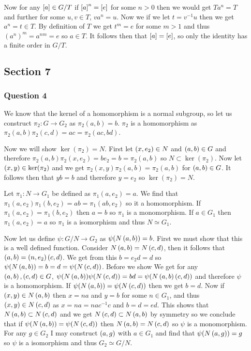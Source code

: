 \documentclass{article}
\begin{document}
Now for any $\left[{a}\right]\in G/T$ if $\left[{a}\right]^n = \left[{e}\right]$ for some $n > 0$ then we would get $Ta^n = T$ and further for some $u,v\in T$, $va^n = u$. Now we if we let $t =v^{-1}u$ then we get $a^n = t \in T$. By definition of $T$ we get $t^m = e$ for some $m > 1$ and thus $\left(a^n\right)^m = a^{nm} = e$ so $a \in T$. It follows then that $\left[{a}\right] = \left[{e}\right]$, so only the identity has a finite order in $G/T$.


\subsection{Section 7}
\subsubsection{Question 4}
We know that the kernel of a homomorphism is a normal subgroup, so let us construct $\pi_2:G\to G_2$ as $\pi_2(a,b) = b$. $\pi_2$ is a homomorphism as $\pi_2(a,b)\pi_2(c,d) = ac = \pi_2(ac,bd)$.

Now we will show $\ker(\pi_2) = N$. First let $\left( {x} , {e_2} \right) \in N$ and $\left( {a} , {b} \right) \in G$ and therefore $\pi_2(a,b)\pi_2(x,e_2) = be_2 = b = \pi_2(a,b)$ so $N \subset \ker(\pi_2)$. Now let $\left( {x} , {y} \right)\in\ker(\pi_2)$ and we get $\pi_2(x,y)\pi_2(a,b) = \pi_2(a,b)$ for $\left( {a} , {b} \right) \in G$. It follows then that $yb = b$ and therefore $y=e_2$ so $\ker(\pi_2) = N$.

Let $\pi_1:N\to G_1$ be defined as $\pi_1(a,{e_2}) = a$. We find that $\pi_1(a,e_2)\pi_1(b,e_2) = ab = \pi_1(ab,e_2)$ so it a homomorphism. If $\pi_1(a,e_2) = \pi_1(b,e_2)$ then $a =b$ so $\pi_1$ is a monomorphism. If $a \in G_1$ then $\pi_1(a, e_2) = a$ so $\pi_1$ is a isomorphism and thus $N \simeq G_1$.

Now let us define $\psi:G/N \to G_2$ as $\psi(N\left( {a} , {b} \right)) = b$. First we must show that this is a well defined function. Consider $N\left( {a} , {b} \right) = N\left( {c} , {d} \right)$, then it follows that $\left( {a} , {b} \right) = \left( {n} , {e_2} \right)\left( {c} , {d} \right)$. We get from this $b = e_2d = d$ so $\psi(N\left( {a} , {b} \right)) = b = d = \psi(N\left( {c} , {d} \right))$. Before we show  We get for any $\left( {a} , {b} \right), \left( {c} , {d} \right) \in G$,  $\psi(N\left( {a} , {b} \right))\psi(N\left( {c} , {d} \right)) = bd = \psi(N\left( {a} , {b} \right)\left( {c} , {d} \right))$ and therefore $\psi$ is a homomorphism. If $\psi(N\left( {a} , {b} \right)) = \psi(N\left( {c} , {d} \right))$ then we get $b = d$. Now if $\left( {x} , {y} \right) \in N\left( {a} , {b} \right)$ then $x = na$ and $y = b$ for some $n \in G_1$, and thus $\left( {x} , {y} \right) \in N\left( {c} , {d} \right)$ as $x = na = nac^{-1}c$ and $b = d = ed$. This shows that $N\left( {a} , {b} \right) \subset N\left( {c} , {d} \right)$ and we get $N\left( {c} , {d} \right) \subset N\left( {a} , {b} \right)$ by symmetry so we conclude that if $\psi(N\left( {a} , {b} \right))=\psi(N \left( {c} , {d} \right))$ then $N\left( {a} , {b} \right) = N\left( {c} , {d} \right)$ so $\psi$ is a monomorphism. For any $g \in G_2$ I may construct $\left( {a} , {g} \right)$ with $a \in G_1$ and find that $\psi(N\left( {a} , {g} \right)) = g$ so $\psi$ is a isomorphism and thus $G_2 \simeq G/N$.
\end{document}
